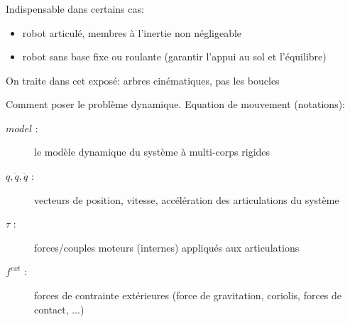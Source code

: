 \documentclass[10pt]{beamer}
\begin{document}
\begin{frame}[allowframebreaks]
  \frametitle{}
  
  Indispensable dans certains cas:
  	\begin{itemize}
  	\item robot articulé, membres à l'inertie non négligeable
  	\item robot sans base fixe ou roulante (garantir l'appui au sol et l'équilibre)
  	\end{itemize}
  	
  On traite dans cet exposé: arbres cinématiques, pas les boucles
  
  Comment poser le problème dynamique. Equation de mouvement (notations):
  	\begin{description}
	  \item[$model$ :] le modèle dynamique du système à multi-corps rigides
	  \item[$q, \dot{q}, \ddot{q}$ :] vecteurs de position, vitesse, accélération des articulations du système
	  \item[$\tau$ :] forces/couples moteurs (internes) appliqués aux articulations
	  \item[$f^{ext}$ :] forces de contrainte extérieures (force de gravitation, coriolis, forces de contact, ...)
	\end{description}
	

\end{frame}
\end{document}
